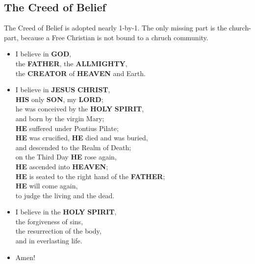 \documentclass[12pt,a4paper]{article}
\newcommand{\Allmighty}[0]{\textbf{ALLMIGHTY}}
\newcommand{\Christ}[0]{\textbf{CHRIST}}
\newcommand{\Creator}[0]{\textbf{CREATOR}}
\newcommand{\God}[0]{\textbf{GOD}}
\newcommand{\Father}[0]{\textbf{FATHER}}
\newcommand{\He}[0]{\textbf{HE}}
\newcommand{\Heaven}[0]{\textbf{HEAVEN}}
\newcommand{\His}[0]{\textbf{HIS}}
\newcommand{\Holy}[0]{\textbf{HOLY}}
\newcommand{\Jesus}[0]{\textbf{JESUS}}
\newcommand{\Lord}[0]{\textbf{LORD}}
\newcommand{\Son}[0]{\textbf{SON}}
\newcommand{\Spirit}[0]{\textbf{SPIRIT}}
\begin{document}
	\subsection{The Creed of Belief}
		The Creed of Belief is adopted nearly 1-by-1.
		The only missing part is the church-part,
		because a Free Christian is not bound to a chruch community.
		\\
		\begin{itemize}[nosep]
			\item	I believe in {\God},
					\\
					the {\Father},
					the {\Allmighty},
					\\
					the {\Creator} of {\Heaven} and Earth.
			\item	I believe in {\Jesus} {\Christ},
					\\
					{\His} only {\Son},
					my {\Lord};
					\\
					he was conceived by the {\Holy} {\Spirit},
					\\
					and born by the virgin Mary;
					\\
					{\He} suffered under Pontius Pilate;
					\\		
					{\He} was crucified, {\He} died and was buried,
					\\
					and descended to the Realm of Death;
					\\
					on the Third Day {\He} rose again,
					\\
					{\He} ascended into {\Heaven};
					\\
					{\He} is seated to the right hand of the {\Father};
					\\
					{\He} will come again,
					\\
					to judge the living and the dead.
			\item	I believe in the {\Holy} {\Spirit},
					\\
					the forgiveness of sins,
					\\
					the resurrection of the body,
					\\
					and in everlasting life.
			\item	Amen!
		\end{itemize}
		
\end{document}
